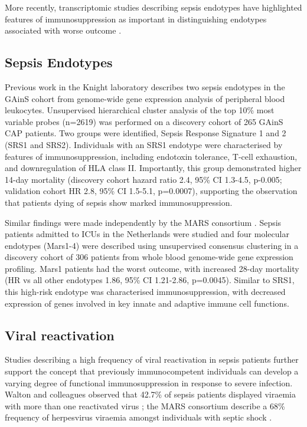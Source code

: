 More recently, transcriptomic studies describing sepsis endotypes have highlighted features of immunosuppression as important in distinguishing endotypes associated with worse outcome \parencite{Davenport2016} \parencite{Scicluna2017}.

\subsection{Sepsis Endotypes}
Previous work in the Knight laboratory \parencite{Davenport2016} describes two sepsis endotypes in the GAinS cohort from genome-wide gene expression analysis of peripheral blood leukocytes. Unsupervised hierarchical cluster analysis of the top 10\% most variable probes (n=2619) was performed on a discovery cohort of 265 GAinS CAP patients. Two groups were identified, Sepsis Response Signature 1 and 2 (SRS1 and SRS2). Individuals with an SRS1 endotype were characterised by features of immunosuppression, including endotoxin tolerance, T-cell exhaustion, and downregulation of HLA class II. Importantly, this group demonstrated higher 14-day mortality (discovery cohort hazard ratio 2.4, 95\% CI 1.3-4.5, p-0.005; validation cohort HR 2.8, 95\% CI 1.5-5.1, p=0.0007), supporting the observation that patients dying of sepsis show marked immunosuppression.

Similar findings were made independently by the MARS consortium \parencite{Scicluna2017}. Sepsis patients admitted to ICUs in the Netherlands were studied and four molecular endotypes (Mars1-4) were described using unsupervised consensus clustering in a discovery cohort of 306 patients from whole blood genome-wide gene expression profiling. Mars1 patients had the worst outcome, with increased 28-day mortality (HR vs all other endotypes 1.86, 95\% CI 1.21-2.86, p=0.0045). Similar to SRS1, this high-risk endotype was characterised immunosuppression, with decreased expression of genes involved in key innate and adaptive immune cell functions.

\subsection{Viral reactivation}
Studies describing a high frequency of viral reactivation in sepsis patients further support the concept that previously immunocompetent individuals can develop a varying degree of functional immunosuppression in response to severe infection. Walton and colleagues observed that 42.7\% of sepsis patients displayed viraemia with more than one reactivated virus \parencite{Walton2014}; the MARS consortium describe a 68\% frequency of herpesvirus viraemia amongst individuals with septic shock \parencite{Ong2017}. 

